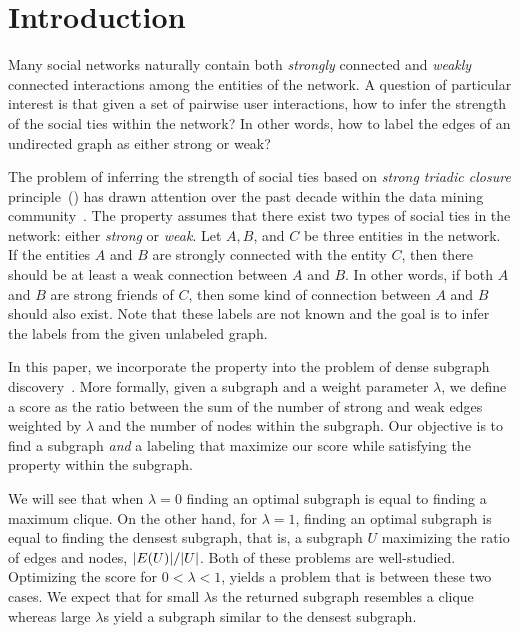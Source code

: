 \section{Introduction}

Many social networks naturally contain both {\em strongly} connected and {\em weakly} connected interactions among the entities of the network.
A question of particular interest is that given a set of pairwise user interactions, how to infer the strength of the social ties within the network? In other words, how to label the edges of an undirected graph as either strong or weak?

The problem of inferring the strength of social ties based on {\em strong triadic closure} principle~(\stc) has drawn attention over the past decade within the data mining community~\cite{sintos2014using,rozenshtein2017inferring,adriaens2020relaxing,oettershagen2022inferring,konstantinidis2018strong,matakos2022strengthening}. The \stc property assumes that there exist two types of social ties in the network: either {\em strong} or {\em weak}.
Let $A, B$, and $C$ be three entities in the network.
If the entities $A$ and $B$ are strongly connected with the entity $C$, then there should be at least a weak connection between $A$ and $B$. In other words, if both $A$ and $B$ are strong friends of $C$, then some kind of connection between $A$ and $B$ should also exist.
Note that these labels are not known and the goal is to infer the labels from the given unlabeled graph.

In this paper, we incorporate the \stc property into the problem of dense subgraph discovery~\cite{sintos2014using, goldberg1984finding}. More formally, given a subgraph and a weight parameter $\lambda$, we define a score as the ratio between the sum of the number of {strong} and {weak} edges weighted by $\lambda$ and the number of nodes within the subgraph.
Our objective is to find a subgraph \emph{and} a labeling that maximize our score while satisfying the \stc property within the subgraph. 

We will see that when $\lambda = 0$ finding an optimal subgraph is equal to finding a maximum clique. On the other hand, for $\lambda = 1$, finding an optimal subgraph is equal to finding the densest subgraph, that is, a subgraph $U$ maximizing the ratio of edges and nodes, ${\left|E(U)\right|}/{\left|U\right|}$. Both of these problems are well-studied. Optimizing the score for $0 < \lambda < 1$, yields a problem that is between these two cases. We expect that for small $\lambda$s the returned subgraph resembles a clique whereas large $\lambda$s yield a subgraph similar to the densest subgraph.

